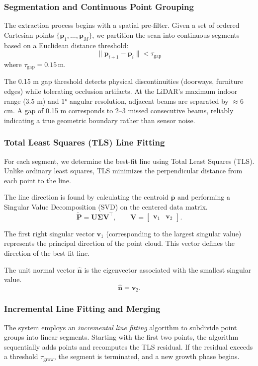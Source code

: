 \documentclass[11pt]{article}
\begin{document}
\subsubsection{Segmentation and Continuous Point Grouping}
The extraction process begins with a spatial pre-filter. Given a set of ordered Cartesian points $\{\mathbf{p}_1, \dots, \mathbf{p}_M\}$, we partition the scan into continuous segments based on a Euclidean distance threshold:
\begin{equation}
	\|\mathbf{p}_{i+1} - \mathbf{p}_i\| < \tau_{\text{gap}}
\end{equation}
where $\tau_{\text{gap}} = 0.15$\,m.

The 0.15 m gap threshold detects physical discontinuities (doorways, furniture edges) while tolerating occlusion artifacts. At the LiDAR's maximum indoor range (3.5 m) and 1° angular resolution, adjacent beams are separated by $\approx$6 cm. A gap of 0.15 m corresponds to 2–3 missed consecutive beams, reliably indicating a true geometric boundary rather than sensor noise.


\subsubsection{Total Least Squares (TLS) Line Fitting}
For each segment, we determine the best-fit line using Total Least Squares (TLS). Unlike ordinary least squares, TLS minimizes the perpendicular distance from each point to the line.

The line direction is found by calculating the centroid $\bar{\mathbf{p}}$ and performing a Singular Value Decomposition (SVD) on the centered data matrix. 
\[
\widetilde{\mathbf{P}}
=
\mathbf{U}
\boldsymbol{\Sigma}
\mathbf{V}^\top,
\qquad
\mathbf{V}
=
\begin{bmatrix}
	\mathbf{v}_1 & \mathbf{v}_2
\end{bmatrix}.
\]

The first right singular vector $\mathbf{v}_1$
(corresponding to the largest singular value)
represents the principal direction of the point cloud.
This vector defines the direction of the best-fit line.

The unit normal vector $\hat{\mathbf{n}}$ is the eigenvector associated with the smallest singular value.
\[
\hat{\mathbf{n}}
=
\mathbf{v}_2.
\]


\subsubsection{Incremental Line Fitting and Merging}
The system employs an \textit{incremental line fitting} algorithm to subdivide point groups into linear segments. Starting with the first two points, the algorithm sequentially adds points and recomputes the TLS residual. If the residual exceeds a threshold $\tau_{\text{grow}}$, the segment is terminated, and a new growth phase begins.
\end{document}

